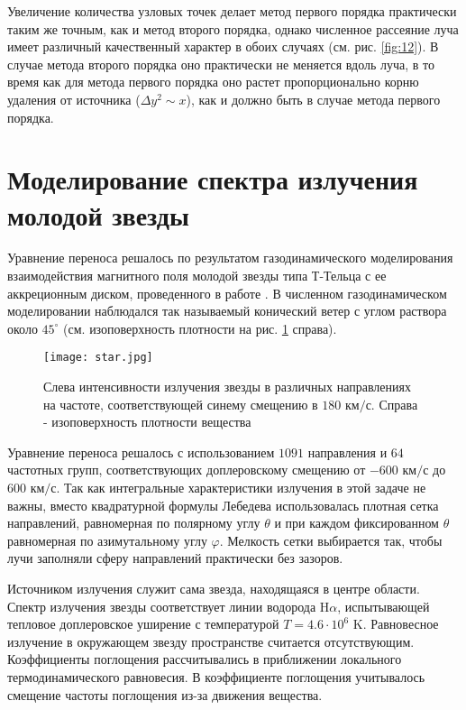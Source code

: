 Увеличение количества узловых точек делает метод первого порядка практически таким же точным, как и метод второго порядка, однако численное рассеяние луча имеет различный качественный характер в обоих случаях (см. рис. \ref{fig:12}). В случае метода второго порядка оно практически не меняется вдоль луча, в то время как для метода первого порядка оно растет пропорционально корню удаления от источника ($\Delta y^2 \sim x$), как и должно быть в случае метода первого порядка. 

\section{Моделирование спектра излучения молодой звезды}
Уравнение переноса решалось по результатом газодинамического моделирования взаимодействия магнитного поля молодой звезды типа Т-Тельца с ее аккреционным диском, проведенного в работе \cite{rom_2009}. В численном газодинамическом моделировании наблюдался так называемый конический ветер с углом раствора около $45^\circ$ (см. изоповерхность плотности на рис. \ref{fig:15} справа). 
\begin{figure}[ht!]
\centering
\texttt{[image: star.jpg]}
\caption{Слева интенсивности излучения звезды в различных направлениях на частоте, соответствующей синему смещению в $180 \text{ км/с}$. Справа - изоповерхность плотности вещества}
\label{fig:15}
\end{figure}

Уравнение переноса решалось с использованием $1091$ направления и $64$ частотных групп, соответствующих доплеровскому смещению от $-600 \text{ км/с}$ до $600 \text{ км/с}$. Так как интегральные характеристики излучения в этой задаче не важны, вместо квадратурной формулы Лебедева использовалась плотная сетка направлений, равномерная по полярному углу $\theta$ и при каждом фиксированном $\theta$ равномерная по азимутальному углу $\varphi$. Мелкость сетки выбирается так, чтобы лучи заполняли сферу направлений практически без зазоров.

Источником излучения служит сама звезда, находящаяся в центре области. Спектр излучения звезды соответствует линии водорода $\text{H}\alpha$, испытывающей тепловое доплеровское уширение с температурой $T = 4.6 \cdot 10^6 \text{ K}$. Равновесное излучение в окружающем звезду пространстве считается отсутствующим. Коэффициенты поглощения рассчитывались в приближении локального термодинамического равновесия. В коэффициенте поглощения учитывалось смещение частоты поглощения из-за движения вещества.
 
